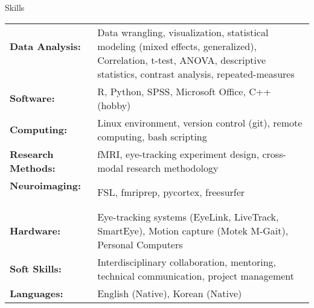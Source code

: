 \documentclass{resume} %
\begin{document}
    \begin{rSection}{Skills}
        
        \begin{tabular}{ @{} >{\bfseries}l @{\hspace{3ex}} 
                >{\RaggedRight}p{} }
            Data Analysis: \ & Data wrangling, visualization, statistical 
            modeling (mixed effects, generalized), Correlation, t-test, ANOVA, 
            descriptive statistics, contrast analysis, repeated-measures \\
            Software: \ & R, Python, SPSS, Microsoft Office, C++ (hobby) \\
            Computing: \ & Linux environment, version control (git), remote 
            computing, bash scripting \\
            Research Methods: \ & fMRI, eye-tracking experiment design, 
            cross-modal research methodology \\
            Neuroimaging: \ & FSL, fmriprep, pycortex, freesurfer \\
            Hardware: \ & Eye-tracking systems (EyeLink, LiveTrack, SmartEye), 
            Motion capture (Motek M-Gait), Personal Computers \\
            Soft Skills: \ & Interdisciplinary collaboration, mentoring, 
            technical communication, project management \\
            Languages: \ & English (Native), Korean (Native)
        \end{tabular}
        
    \end{rSection}
    
    
\end{document}
